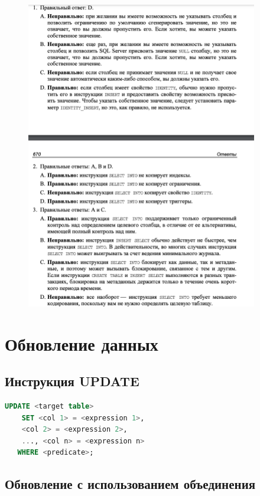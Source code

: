 \begin{figure}[h!]
	\begin{center}
		\includegraphics[width=0.9\textwidth]{img/ans21.png}
	\end{center}
	\captionsetup{justification=centering}
\end{figure}


\section{Обновление данных}

\subsection{Инструкция UPDATE}

\begin{lstlisting}[label=lst:funcReturn, language=sql]
	UPDATE <target table>
	SET <col 1> = <expression 1>,
	<col 2> = <expression 2>,
	..., <col n> = <expression n>
   WHERE <predicate>;
\end{lstlisting}

\subsection{Обновление с использованием объединения}

